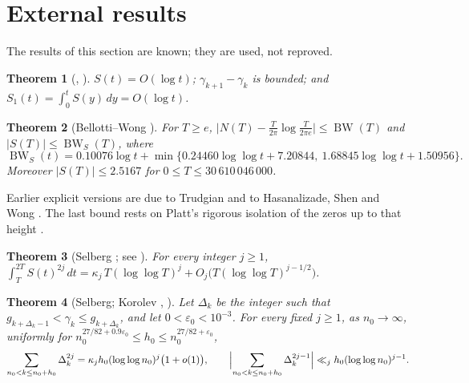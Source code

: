 \documentclass[preprint,12pt]{elsarticle}
\numberwithin{equation}{section}
\theoremstyle{plain}
\newtheorem{theorem}{Theorem}[section]
\theoremstyle{definition}
\theoremstyle{remark}
\newcommand{\BW}{\operatorname{BW}}
\newcommand{\BWS}{\operatorname{BW}_S}
\begin{document}
\section{External results}
\label{sec:known_results}

The results of this section are known; they are used, not reproved.

\begin{theorem}[{\cite[Thms.~9.4, 9.9 and \S9.12]{Titchmarsh1986}}, {\cite{Littlewood1924}}]\label{thm:known_basic}
$S(t)=O(\log t)$; $\gamma_{k+1}-\gamma_k$ is bounded; and $S_1(t)=\int_0^tS(y)\,dy=O(\log t)$.
\end{theorem}

\begin{theorem}[Bellotti--Wong {\cite[Thm.~1.1, Cor.~1.5 and (1.2)]{BellottiWong2025}}]\label{thm:known_BW}
For $T\ge e$, $\bigl|N(T)-\frac T{2\pi}\log\frac T{2\pi e}\bigr|\le\BW(T)$ and $|S(T)|\le\BWS(T)$, where
\begin{equation}
\BWS(t)=0.10076\log t+\min\{0.24460\log\log t+7.20844,\ 1.68845\log\log t+1.50956\}.
\label{eq:BWS_def}
\end{equation}
Moreover $|S(T)|\le2.5167$ for $0\le T\le30\,610\,046\,000$.
\end{theorem}
Earlier explicit versions are due to Trudgian \cite{Trudgian2014} and to Hasanalizade, Shen and Wong \cite{HasanalizadeShenWong2022}. The last bound rests on Platt's rigorous isolation of the zeros up to that height \cite[(1.2)]{BellottiWong2025}.

\begin{theorem}[Selberg {\cite{Selberg1946a}}; see {\cite[p.~225]{Fujii1974}}]\label{thm:known_selberg_moments}
For every integer $j\ge1$, $\int_T^{2T}S(t)^{2j}\,dt=\kappa_j\,T(\log\log T)^j+O_j\bigl(T(\log\log T)^{j-1/2}\bigr)$.
\end{theorem}

\begin{theorem}[Selberg; Korolev {\cite{Korolev2012}}, {\cite[Thm.~6]{Korolev2011}}]\label{thm:known_korolev}
Let $\Delta_k$ be the integer such that $g_{k+\Delta_k-1}<\gamma_k\le g_{k+\Delta_k}$, and let $0<\varepsilon_0<10^{-3}$. For every fixed $j\ge1$, as $n_0\to\infty$, uniformly for $n_0^{27/82+0.9\varepsilon_0}\le h_0\le n_0^{27/82+\varepsilon_0}$,
\begin{equation}
\sum_{n_0<k\le n_0+h_0}\Delta_k^{2j}=\kappa_jh_0(\log\log n_0)^j\bigl(1+o(1)\bigr),\qquad
\Bigl|\sum_{n_0<k\le n_0+h_0}\Delta_k^{2j-1}\Bigr|\ll_j h_0(\log\log n_0)^{j-1}.
\label{eq:korolev_moments}
\end{equation}
\end{theorem}
\end{document}
